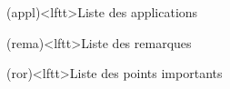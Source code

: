 \documentclass[../../main/main.tex]{subfiles}
\begin{document}
\begin{boxes}
\begin{tcb}
	\end{tcb}
	\begin{tcb}(appl)<lftt>{Liste des applications}
	\end{tcb}
	\begin{tcb}(rema)<lftt>{Liste des remarques}
	\end{tcb}
	\begin{tcb}(ror)<lftt>{Liste des points importants}
	\end{tcb}
\end{boxes}
\vspace*{\fill}
\newpage
\end{document}
